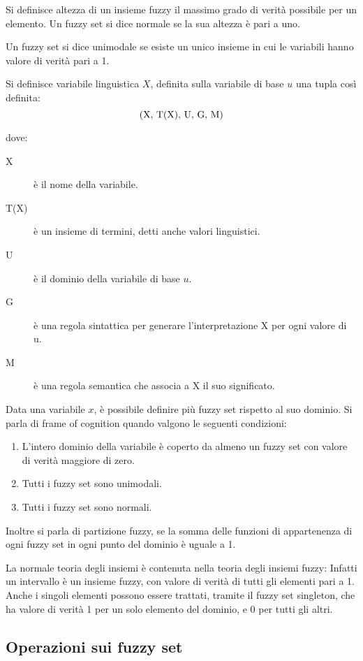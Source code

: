Si definisce altezza di un insieme fuzzy il massimo grado di verità possibile per un elemento.
Un fuzzy set si dice normale se la sua altezza è pari a uno.

Un fuzzy set si dice unimodale se esiste un unico insieme in cui le variabili hanno valore di verità pari a 1.


Si definisce variabile linguistica $X$, definita sulla variabile di base $u$ una tupla così definita:
\begin{equation*}
$(X, T(X), U, G, M)$
\end{equation*}

dove:

\begin{description}
 \item [X] è il nome della variabile.
 \item [T(X)] è un insieme di termini, detti anche valori linguistici.
 \item [U] è il dominio della variabile di base $u$.
 \item [G] è una regola sintattica per generare l'interpretazione X per ogni valore di u.
 \item [M] è una regola semantica che associa a X il suo significato.
\end{description}


Data una variabile $x$, è possibile definire più fuzzy set rispetto al suo dominio. Si parla di frame of cognition quando valgono le seguenti condizioni:
\begin{enumerate}
 \item L'intero dominio della variabile è coperto da almeno un fuzzy set con valore di verità maggiore di zero.
 \item Tutti i fuzzy set sono unimodali.
 \item Tutti i fuzzy set sono normali.
\end{enumerate}

Inoltre si parla di partizione fuzzy, se la somma delle funzioni di appartenenza di ogni fuzzy set in ogni punto del dominio è uguale a 1.

La normale teoria degli insiemi è contenuta nella teoria degli insiemi fuzzy: Infatti un intervallo è un insieme fuzzy, con valore di verità di tutti gli elementi pari a 1. Anche i singoli elementi possono essere trattati, tramite il fuzzy set singleton, che ha valore di verità 1 per un solo elemento del dominio, e 0 per tutti gli altri.

\subsection{Operazioni sui fuzzy set}

